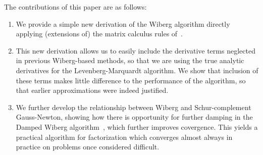 \documentclass[runningheads]{llncs}
\def\eqlabel#1{\label{eq:#1}}
\def\tr{^\top}
\def\xcomment#1{\textcolor[gray]{.2}{\text{\em---#1}}}
\def\comment#1{\kern-1cm\xcomment{#1}}
\def\vec{\operatorname{vec}}
\def\hadamard{\odot}
\def\m#1{\ensuremath{\mathtt{#1}}}
\def\v#1{\ensuremath{\mathbf{#1}}}
\def\mU{\m U}
\def\mV{\m V}
\def\mW{\m W}
\def\mM{\m M}
\def\twiddle#1{{\tilde{#1}}}
\def\tW{\twiddle\mW}
\begin{document}
The contributions of this paper are as follows:
\begin{enumerate}
\item We provide a simple new derivation of the Wiberg algorithm directly applying (extensions of) the matrix calculus rules of~\cite{minka00}.
\item This new derivation allows us to easily include the derivative terms neglected in previous Wiberg-based methods, so that we are using the true analytic derivatives for the Levenberg-Marquardt algorithm.   We show that inclusion of these terms makes little difference to the performance of the algorithm, so that earlier approximations were indeed justified.
\item We further develop the relationship between Wiberg and Schur-complement Gauss-Newton, showing how there is opportunity for further damping in the Damped Wiberg algorithm~\cite{okatani2011efficient}, which further improves covergence.   This yields a practical algorithm for factorization which converges almost always in practice on problems once considered difficult.
\end{enumerate}



\def\sym{\operatorname{sym}}
\def\inv#1{{#1}^{\mathsf{-1}}}
\def\mA{\m A}

\def\Id#1{\m{I}_{#1}}
\def\kron#1#2{{#1}\otimes{#2}}
\def\pinv#1{{{#1}^\dagger}}
\def\diff[#1]{\textcolor{diffcol}{\partial[#1]}}

\def\equations1{
\begin{align}
\vec(\mW \hadamard (\mM - \mU \mV\tr))
  & = \tW \vec(\mM - \mU \mV\tr) & \comment{ Define $\tW := \operatorname{diag}(\vec\mW)$ }
\\& = \tW \vec(\mM) - \tW \vec(\mU \mV\tr)
\\& = \tW \v m - \tW (\kron{\Id n}{\mU}) \vec(\mV\tr) & \xcomment{ Define $\v m := \vec\mM$ }
\eqlabel{resvec1}
\\& = \tW\v m - \tW \twiddle \mU \vec(\mV\tr) &
\comment{ Define $\twiddle\mU := \kron{\Id n}{\mU}$}
\eqlabel{resvec2}
\end{align}
}
\end{document}
